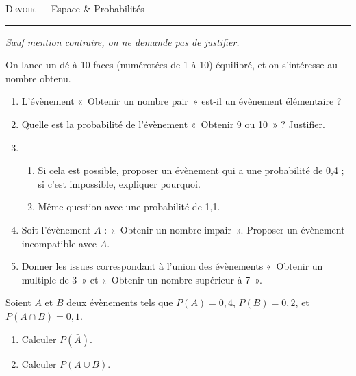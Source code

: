 \documentclass[11pt]{article}
\begin{document}
\begin{center}
  \textsc{Devoir} --- Espace \& Probabilités
\end{center}
\hrule

\begin{exercice}\emph{Sauf mention contraire, on ne demande pas de justifier.}

  On lance un dé à 10 faces (numérotées de 1 à 10) équilibré, et on s'intéresse au nombre obtenu.
  \begin{enumerate}
    \item L'évènement «~Obtenir un nombre pair~» est-il un évènement élémentaire ?
    \item Quelle est la probabilité de l'évènement «~Obtenir 9 ou 10~» ? Justifier.
    \item
      \begin{enumerate}
      \item Si cela est possible, proposer un évènement qui a une probabilité de 0,4 ; si c'est impossible, expliquer pourquoi.
      \item Même question avec une probabilité de 1,1.
    \end{enumerate}
    \item Soit l'évènement $A$ : «~Obtenir un nombre impair~».
        Proposer un évènement incompatible avec $A$.
    \item Donner les issues correspondant à l'union des évènements «~Obtenir un multiple de 3~» et «~Obtenir un nombre supérieur à 7~».
  \end{enumerate}
\end{exercice}

\begin{exercice}[3 points]
  Soient $A$ et $B$ deux évènements tels que $P(A)=0,4$, $P(B)=0,2$, et $P(A\cap B)=0,1$.
  \begin{enumerate}
    \item Calculer $P(\bar A)$.
    \item Calculer $P(A\cup B)$.
  \end{enumerate}
\end{exercice}
\end{document}
